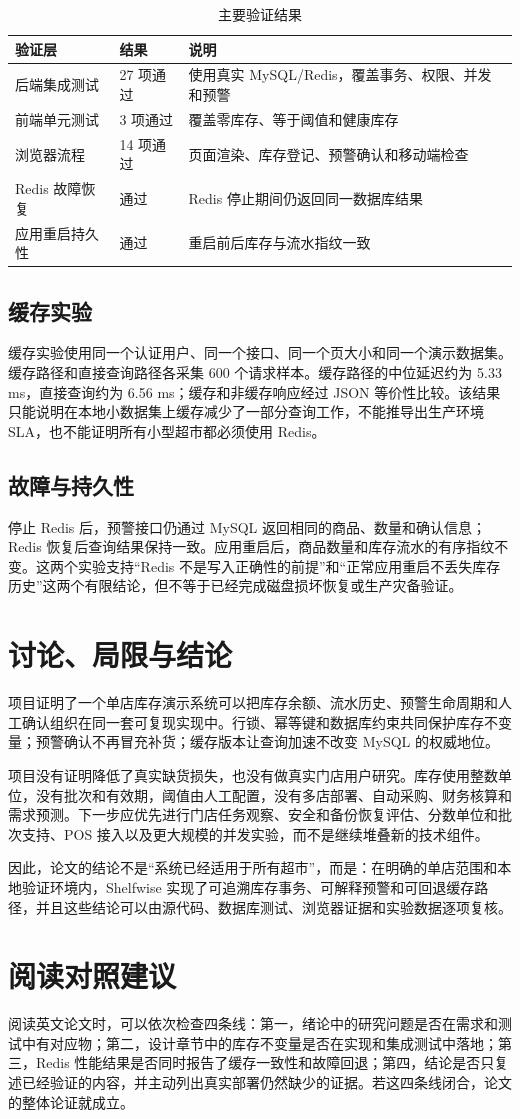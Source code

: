\documentclass[UTF8,a4paper,11pt]{ctexart}
\begin{document}
\begin{table}[H]\centering\small
\caption{主要验证结果}
\begin{tabularx}{\textwidth}{p{}p{}Y}\toprule
验证层 & 结果 & 说明\\\midrule
后端集成测试 & 27 项通过 & 使用真实 MySQL/Redis，覆盖事务、权限、并发和预警\\
前端单元测试 & 3 项通过 & 覆盖零库存、等于阈值和健康库存\\
浏览器流程 & 14 项通过 & 页面渲染、库存登记、预警确认和移动端检查\\
Redis 故障恢复 & 通过 & Redis 停止期间仍返回同一数据库结果\\
应用重启持久性 & 通过 & 重启前后库存与流水指纹一致\\\bottomrule
\end{tabularx}
\end{table}

\subsection{缓存实验}
缓存实验使用同一个认证用户、同一个接口、同一个页大小和同一个演示数据集。缓存路径和直接查询路径各采集 600 个请求样本。缓存路径的中位延迟约为 5.33 ms，直接查询约为 6.56 ms；缓存和非缓存响应经过 JSON 等价性比较。该结果只能说明在本地小数据集上缓存减少了一部分查询工作，不能推导出生产环境 SLA，也不能证明所有小型超市都必须使用 Redis。

\subsection{故障与持久性}
停止 Redis 后，预警接口仍通过 MySQL 返回相同的商品、数量和确认信息；Redis 恢复后查询结果保持一致。应用重启后，商品数量和库存流水的有序指纹不变。这两个实验支持“Redis 不是写入正确性的前提”和“正常应用重启不丢失库存历史”这两个有限结论，但不等于已经完成磁盘损坏恢复或生产灾备验证。

\section{讨论、局限与结论}
项目证明了一个单店库存演示系统可以把库存余额、流水历史、预警生命周期和人工确认组织在同一套可复现实现中。行锁、幂等键和数据库约束共同保护库存不变量；预警确认不再冒充补货；缓存版本让查询加速不改变 MySQL 的权威地位。

项目没有证明降低了真实缺货损失，也没有做真实门店用户研究。库存使用整数单位，没有批次和有效期，阈值由人工配置，没有多店部署、自动采购、财务核算和需求预测。下一步应优先进行门店任务观察、安全和备份恢复评估、分数单位和批次支持、POS 接入以及更大规模的并发实验，而不是继续堆叠新的技术组件。

因此，论文的结论不是“系统已经适用于所有超市”，而是：在明确的单店范围和本地验证环境内，Shelfwise 实现了可追溯库存事务、可解释预警和可回退缓存路径，并且这些结论可以由源代码、数据库测试、浏览器证据和实验数据逐项复核。

\section*{阅读对照建议}
阅读英文论文时，可以依次检查四条线：第一，绪论中的研究问题是否在需求和测试中有对应物；第二，设计章节中的库存不变量是否在实现和集成测试中落地；第三，Redis 性能结果是否同时报告了缓存一致性和故障回退；第四，结论是否只复述已经验证的内容，并主动列出真实部署仍然缺少的证据。若这四条线闭合，论文的整体论证就成立。
\end{document}
